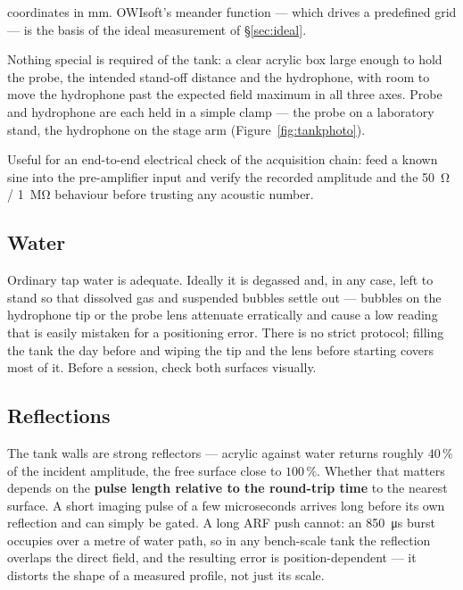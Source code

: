 \documentclass[11pt,a4paper]{article}
\begin{document}
\begin{description}[style=nextline,leftmargin=1em]
    coordinates in \si{\milli\metre}. OWIsoft's meander function --- which drives a predefined grid
    --- is the basis of the ideal measurement of \S\ref{sec:ideal}.
  \item[Tank and mounting.]
    Nothing special is required of the tank: a clear acrylic box large enough to hold the probe, the
    intended stand-off distance and the hydrophone, with room to move the hydrophone past the
    expected field maximum in all three axes. Probe and hydrophone are each held in a simple clamp
    --- the probe on a laboratory stand, the hydrophone on the stage arm (Figure~\ref{fig:tankphoto}).
  \item[Function generator (optional).]
    Useful for an end-to-end electrical check of the acquisition chain: feed a known sine into the
    pre-amplifier input and verify the recorded amplitude and the \SI{50}{\ohm} /
    \SI{1}{\mega\ohm} behaviour before trusting any acoustic number.
\end{description}

\subsection{Water}\label{sec:water}
Ordinary tap water is adequate. Ideally it is degassed and, in any case, left to stand so that
dissolved gas and suspended bubbles settle out --- bubbles on the hydrophone tip or the probe lens
attenuate erratically and cause a low reading that is easily mistaken for a positioning error. There
is no strict protocol; filling the tank the day before and wiping the tip and the lens before
starting covers most of it. Before a session, check both surfaces visually.

\subsection{Reflections}\label{sec:reflections}
The tank walls are strong reflectors --- acrylic against water returns roughly $40\,\%$ of the
incident amplitude, the free surface close to $100\,\%$. Whether that matters depends on the
\textbf{pulse length relative to the round-trip time} to the nearest surface. A short imaging pulse
of a few microseconds arrives long before its own reflection and can simply be gated. A long ARF
push cannot: an \SI{850}{\micro\second} burst occupies over a metre of water path, so in any
bench-scale tank the reflection overlaps the direct field, and the resulting error is
position-dependent --- it distorts the shape of a measured profile, not just its scale.
\end{document}
